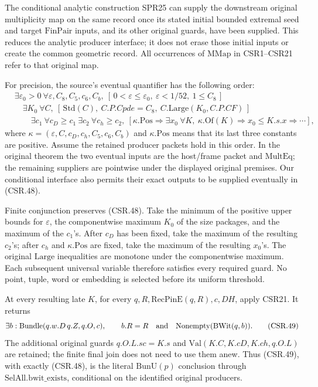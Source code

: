 The conditional analytic construction SPR25 can supply
the downstream original multiplicity map on the same
record once its stated initial bounded extremal seed
and target \(\mathrm{FinPair}\) inputs, and its other
original guards, have been supplied. This reduces the
analytic producer interface; it does not erase those
initial inputs or create the common geometric record.
All occurrences of \(\mathrm{MMap}\) in CSR1--CSR21
refer to that original map.

For precision, the source's eventual quantifier has
the following order:
\[
\begin{split}
 &\exists\varepsilon_0>0\
 \forall\varepsilon,C_8,C_5,c_6,C_b,\
 [\,0<\varepsilon\leq\varepsilon_0,\ 
 \varepsilon<1/52,\ 1\leq C_8\,]\\
 &\quad\exists K_0\ \forall C,\
 [\,\mathrm{Std}(C),\ C.P.Cpde=C_8,\
 C.\mathrm{Large}(K_0,C.P.CF)\,]\\
 &\qquad\exists c_1\ \forall c_D\geq c_1\
 \exists c_2\ \forall c_h\geq c_2,\
 \left[\kappa.\mathrm{Pos}\Rightarrow
 \exists x_0\ \forall K,\
 \kappa.\mathrm{Of}(K)\Rightarrow
 x_0\leq K.s.x\Rightarrow\cdots\right],
\end{split}
\tag{CSR.48}
\]
where \(\kappa=(\varepsilon,C,c_D,c_h,C_5,c_6,C_b)\)
and \(\kappa.\mathrm{Pos}\) means that its last three
constants are positive. Assume the retained producer
packets hold in this order. In the original theorem
the two eventual inputs are the host/frame packet
and \(\mathrm{MultEq}\); the remaining suppliers are
pointwise under the displayed original premises.
Our conditional interface also permits their exact
outputs to be supplied eventually in (CSR.48).

Finite conjunction preserves (CSR.48). Take the minimum
of the positive upper bounds for \(\varepsilon\), the
componentwise maximum \(K_0\) of the size packages,
and the maximum of the \(c_1\)'s. After \(c_D\) has
been fixed, take the maximum of the resulting \(c_2\)'s;
after \(c_h\) and \(\kappa.\mathrm{Pos}\) are fixed,
take the maximum of the resulting \(x_0\)'s.
The original \(\mathrm{Large}\) inequalities are
monotone under the componentwise maximum. Each
subsequent universal variable therefore satisfies
every required guard. No point, tuple, word or
embedding is selected before its uniform threshold.

At every resulting late \(K\), for every
\(q,R,\mathrm{RecPinE}(q,R),c,DH\), apply CSR21.
It returns
\[
 \exists b:\mathrm{Bundle}(q.w.D\,q.Z,q.O,c),\qquad
 b.R=R\quad\hbox{and}\quad
 \mathrm{Nonempty}(\mathrm{BWit}(q,b)).
 \tag{CSR.49}
\]
The additional original guards \(q.O.L.sc=K.s\) and
\(\mathrm{Val}(K.C,K.cD,K.ch,q.O.L)\) are retained;
the finite final join does not need to use them anew.
Thus (CSR.49), with exactly (CSR.48), is the literal
\(\mathrm{BunU}(p)\) conclusion through
\(\mathrm{SelAll.bwit\_exists}\), conditional on the
identified original producers.

